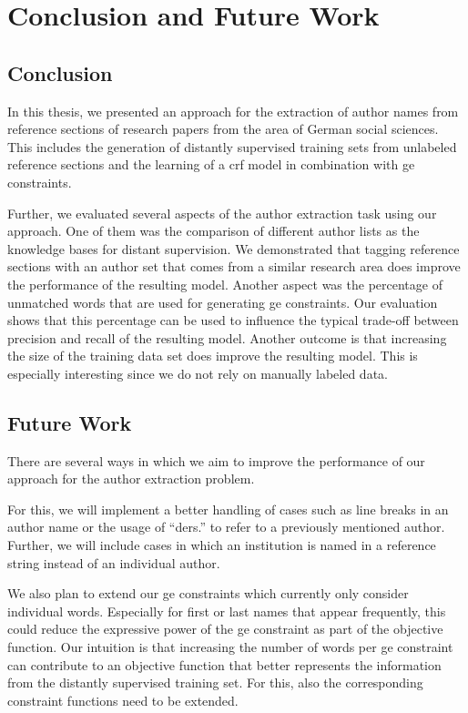 \chapter{Conclusion and Future Work}\label{cha:conclusion-and-future-work}

\section{Conclusion}\label{sec:conclusion}

In this thesis, we presented an approach for the extraction of author names from reference sections of research papers from the area of German social sciences.
This includes the generation of distantly supervised training sets from unlabeled reference sections and the learning of a \gls{crf} model in combination with \gls{ge} constraints.

Further, we evaluated several aspects of the author extraction task using our approach.
One of them was the comparison of different author lists as the knowledge bases for distant supervision.
We demonstrated that tagging reference sections with an author set that comes from a similar research area does improve the performance of the resulting model.
Another aspect was the percentage of unmatched words that are used for generating \gls{ge} constraints.
Our evaluation shows that this percentage can be used to influence the typical trade-off between \gls{precision} and \gls{recall} of the resulting model.
Another outcome is that increasing the size of the training data set does improve the resulting model.
This is especially interesting since we do not rely on manually labeled data.


\section{Future Work}\label{sec:future-work}

There are several ways in which we aim to improve the performance of our approach for the author extraction problem.

For this, we will implement a better handling of cases such as line breaks in an author name or the usage of ``ders.'' to refer to a previously mentioned author.
Further, we will include cases in which an institution is named in a reference string instead of an individual author.

We also plan to extend our \glspl{ge constraint} which currently only consider individual words.
Especially for first or last names that appear frequently, this could reduce the expressive power of the \gls{ge constraint} as part of the \gls{objective function}.
Our intuition is that increasing the number of words per \gls{ge constraint} can contribute to an \gls{objective function} that better represents the information from the distantly supervised training set.
For this, also the corresponding constraint functions need to be extended.

